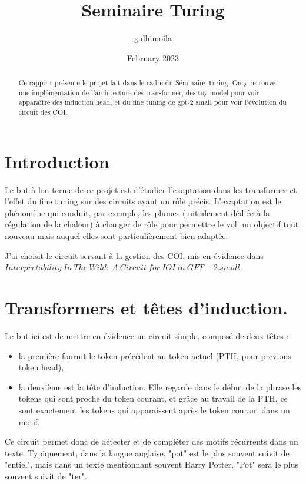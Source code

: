 \documentclass{article}
\title{Seminaire Turing}
\author{g.dhimoila }
\date{February 2023}
\begin{document}
\maketitle


\begin{abstract}
Ce rapport présente le projet fait dans le cadre du Séminaire Turing. On y retrouve une implémentation de l'architecture des transformer, des toy model pour voir apparaître des induction head, et du fine tuning de gpt-2 small pour voir l'évolution du circuit des COI.
\end{abstract}

\section{Introduction}

Le but à lon terme de ce projet est d'étudier l'exaptation dans les transformer et l'effet du fine tuning sur des circuits ayant un rôle précis. L'exaptation est le phénomène qui conduit, par exemple, les plumes (initialement dédiée à la régulation de la chaleur) à changer de rôle pour permettre le vol, un objectif tout nouveau mais auquel elles sont particulièrement bien adaptée.

J'ai choisit le circuit servant à la gestion des COI, mis en évidence dans $Interpretability\ In\ The\ Wild:\ A\ Circuit\ for\ IOI\ in\ GPT-2\ small$.

\section{Transformers et têtes d'induction.}

Le but ici est de mettre en évidence un circuit simple, composé de deux têtes :
\begin{itemize}
    \item la première fournit le token précédent au token actuel (PTH, pour previous token head),
    \item la deuxième est la tête d'induction. Elle regarde dans le début de la phrase les tokens qui sont proche du token courant, et grâce au travail de la PTH, ce sont exactement les tokens qui apparaissent après le token courant dans un motif.
\end{itemize}
Ce circuit permet donc de détecter et de compléter des motifs récurrents dans un texte. Typiquement, dans la langue anglaise, "pot" est le plus souvent suivit de "entiel", mais dans un texte mentionnant souvent Harry Potter, "Pot" sera le plus souvent suivit de "ter".
\end{document}
